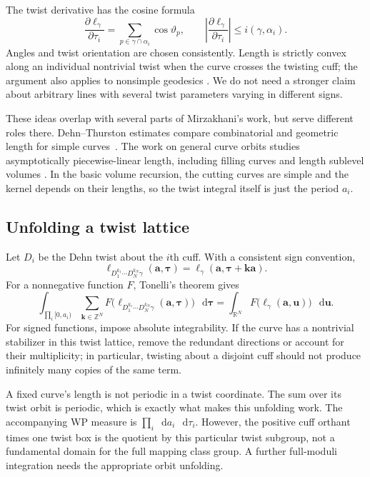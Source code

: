 \documentclass[11pt,a4paper]{article}
\numberwithin{equation}{section}
\theoremstyle{definition}
\theoremstyle{remark}
\newcommand{\dd}{\mathop{}\!\mathrm d}
\newcommand{\RR}{\mathbb R}
\newcommand{\ZZ}{\mathbb Z}
\newcommand{\abs}[1]{\left|#1\right|}
\begin{document}
The twist derivative has the cosine formula
\begin{equation}
 \frac{\partial\ell_\gamma}{\partial\tau_i}
   =\sum_{p\in\gamma\cap\alpha_i}\cos\vartheta_p,
 \qquad
 \abs{\frac{\partial\ell_\gamma}{\partial\tau_i}}
      \le i(\gamma,\alpha_i).
 \label{eq:cosine}
\end{equation}
Angles and twist orientation are chosen consistently. Length is strictly
convex along an individual nontrivial twist when the curve crosses the
twisting cuff; the argument also applies to nonsimple geodesics
\cite{Kerckhoff}. We do not need a stronger claim about arbitrary lines
with several twist parameters varying in different signs.

These ideas overlap with several parts of Mirzakhani's work, but serve
different roles there. Dehn--Thurston estimates compare combinatorial and
geometric length for simple curves~\cite[Section 3]{MirzSimple}. The work
on general curve orbits studies asymptotically piecewise-linear length,
including filling curves and length sublevel volumes
\cite[Sections 4 and 8]{MirzGeneral}. In the basic volume recursion, the
cutting curves are simple and the kernel depends on their lengths, so the
twist integral itself is just the period $a_i$.

\subsection{Unfolding a twist lattice}

Let $D_i$ be the Dehn twist about the $i$th cuff. With a consistent sign
convention,
\[
 \ell_{D_1^{k_1}\cdots D_N^{k_N}\gamma}(\mathbf a,\boldsymbol\tau)
 =\ell_\gamma(\mathbf a,\boldsymbol\tau+\mathbf k\mathbf a).
\]
For a nonnegative function $F$, Tonelli's theorem gives
\begin{equation}
 \boxed{
 \int_{\prod_i[0,a_i)}\sum_{\mathbf k\in\ZZ^N}
 F\bigl(\ell_{D_1^{k_1}\cdots D_N^{k_N}\gamma}
                  (\mathbf a,\boldsymbol\tau)\bigr)\,\dd\boldsymbol\tau
 =\int_{\RR^N}F\bigl(\ell_\gamma(\mathbf a,\mathbf u)\bigr)\,\dd\mathbf u.}
 \label{eq:twistunfold}
\end{equation}
For signed functions, impose absolute integrability. If the curve has a
nontrivial stabilizer in this twist lattice, remove the redundant directions
or account for their multiplicity; in particular, twisting about a disjoint
cuff should not produce infinitely many copies of the same term.

A fixed curve's length is not periodic in a twist coordinate. The sum over
its twist orbit is periodic, which is exactly what makes this unfolding
work. The accompanying WP measure is $\prod_i\dd a_i\,\dd\tau_i$.
However, the positive cuff orthant times one twist box is the quotient by
this particular twist subgroup, not a fundamental domain for the full
mapping class group. A further full-moduli integration needs the appropriate
orbit unfolding.
\end{document}
